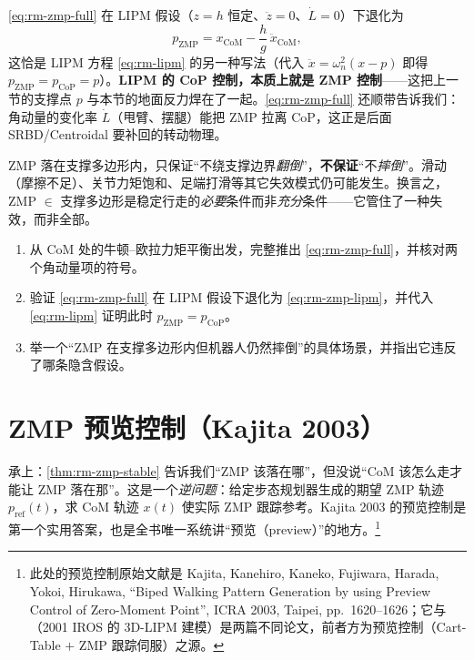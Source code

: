\begin{insight}
\cref{eq:rm-zmp-full} 在 LIPM 假设（$z=h$ 恒定、$\ddot{z}=0$、$\dot{L}=0$）下退化为
\begin{equation}
  p_{\mathrm{ZMP}}=x_{\mathrm{CoM}}-\frac{h}{g}\,\ddot{x}_{\mathrm{CoM}},
  \label{eq:rm-zmp-lipm}
\end{equation}
这恰是 LIPM 方程 \cref{eq:rm-lipm} 的另一种写法（代入 $\ddot{x}=\omega_n^2(x-p)$ 即得 $p_{\mathrm{ZMP}}=p_{\mathrm{CoP}}=p$）。\textbf{LIPM 的 CoP 控制，本质上就是 ZMP 控制}——这把上一节的支撑点 $p$ 与本节的地面反力焊在了一起。\cref{eq:rm-zmp-full} 还顺带告诉我们：角动量的变化率 $\dot{L}$（甩臂、摆腿）能把 ZMP 拉离 CoP，这正是后面 SRBD/Centroidal 要补回的转动物理。
\end{insight}

\begin{pitfall}
ZMP 落在支撑多边形内，只保证“不绕支撑边界\emph{翻倒}”，\textbf{不保证}“不\emph{摔倒}”。滑动（摩擦不足）、关节力矩饱和、足端打滑等其它失效模式仍可能发生。换言之，ZMP $\in$ 支撑多边形是稳定行走的\emph{必要}条件而非\emph{充分}条件——它管住了一种失效，而非全部。
\end{pitfall}

\begin{exercise}
\begin{enumerate}
  \item 从 CoM 处的牛顿–欧拉力矩平衡出发，完整推出 \cref{eq:rm-zmp-full}，并核对两个角动量项的符号。
  \item 验证 \cref{eq:rm-zmp-full} 在 LIPM 假设下退化为 \cref{eq:rm-zmp-lipm}，并代入 \cref{eq:rm-lipm} 证明此时 $p_{\mathrm{ZMP}}=p_{\mathrm{CoP}}$。
  \item 举一个“ZMP 在支撑多边形内但机器人仍然摔倒”的具体场景，并指出它违反了哪条隐含假设。
\end{enumerate}
\end{exercise}

\section{ZMP 预览控制（Kajita 2003）}
\label{sec:rm-preview}

承上：\cref{thm:rm-zmp-stable} 告诉我们“ZMP 该落在哪”，但没说“CoM 该怎么走才能让 ZMP 落在那”。这是一个\emph{逆问题}：给定步态规划器生成的期望 ZMP 轨迹 $p_{\mathrm{ref}}(t)$，求 CoM 轨迹 $x(t)$ 使实际 ZMP 跟踪参考。Kajita 2003 的预览控制是第一个实用答案\cite{kajita2001lipm}，也是全书唯一系统讲“预览（preview）”的地方。\footnote{此处的预览控制原始文献是 Kajita, Kanehiro, Kaneko, Fujiwara, Harada, Yokoi, Hirukawa, ``Biped Walking Pattern Generation by using Preview Control of Zero-Moment Point'', ICRA 2003, Taipei, pp.\ 1620--1626；它与 \cite{kajita2001lipm}（2001 IROS 的 3D-LIPM 建模）是两篇不同论文，前者方为预览控制（Cart-Table $+$ ZMP 跟踪伺服）之源。}

